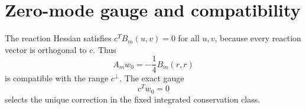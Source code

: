 \section*{Zero-mode gauge and compatibility}
The reaction Hessian satisfies $c^TB_m(u,v)=0$ for all $u,v$, because every
reaction vector is orthogonal to $c$.  Thus
\[
A_mw_0=-\frac14B_m(r,r)
\]
is compatible with the range $c^\perp$.  The exact gauge
\[
c^Tw_0=0
\]
selects the unique correction in the fixed integrated conservation class.
